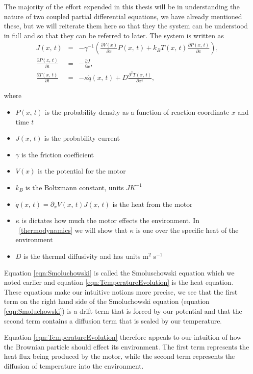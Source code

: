 The majority of the effort expended in this thesis will be in understanding the nature of two coupled partial differential equations, we have already mentioned these, but we will reiterate them here so that they the system can be understood in full and so that they can be referred to later. The system is written as
\begin{eqnarray}
J(x, \, t) &=& -\gamma^{-1} \left ( \frac{\partial V(x)}{\partial x} P(x, \, t) + k_B T(x, \, t) \frac{\partial P(x, \, t)}{\partial x} \right ), \label{eqn:current} \\
\frac{\partial P(x, \, t)}{\partial t} &=& -\frac{\partial J}{\partial x}, \label{eqn:Smoluchowski} \\
\frac{\partial T(x, \, t)}{\partial t} &=& -\kappa \dot{q}(x, \, t) + D \frac{\partial^2 T(x, 
\, t)}{\partial x^2}, \label{eqn:TemperatureEvolution}
\end{eqnarray}

where
\begin{itemize}
\item{$P(x, \, t)$ is the probability density as a function of  reaction coordinate $x$ and time $t$}
\item{$J(x, \, t)$ is the probability current}
\item{$\gamma$ is the friction coefficient}
\item{$V(x)$ is the potential for the motor}
\item{$k_B$ is the Boltzmann constant, units $J K^{-1}$}
\item{$\dot{q}(x, \, t) = \partial_x V(x, \, t) J(x, \, t)$ is the heat from the motor}
\item{$\kappa$ is dictates how much the motor effects the environment. In ~\autoref{thermodynamics} we will show that $\kappa$ is one over the specific heat of the environment}
\item{$D$ is the thermal diffusivity and has units m$^2$ s$^{-1}$}
\end{itemize}
Equation \ref{eqn:Smoluchowski} is called the Smoluschowski equation which we noted earlier and equation \ref{eqn:TemperatureEvolution} is the heat equation. These equations make our intuitive notions more precise, we see that the first term on the right hand side of the Smoluchowski equation (equation \ref{eqn:Smoluchowski}) is a drift term that is forced by our potential and that the second term contains a diffusion term that is scaled by our temperature.

Equation \ref{eqn:TemperatureEvolution} therefore appeals to our intuition of how the Brownian particle should effect its environment. The first term represents the heat flux being produced by the motor, while the second term represents the diffusion of temperature into the environment.

